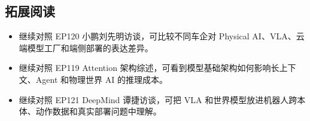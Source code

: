 \subsection{拓展阅读}

\begin{itemize}
\item 继续对照 EP120 小鹏刘先明访谈，可比较不同车企对 Physical AI、VLA、云端模型工厂和端侧部署的表达差异。
\item 继续对照 EP119 Attention 架构综述，可看到模型基础架构如何影响长上下文、Agent 和物理世界 AI 的推理成本。
\item 继续对照 EP121 DeepMind 谭捷访谈，可把 VLA 和世界模型放进机器人跨本体、动作数据和真实部署问题中理解。
\end{itemize}


